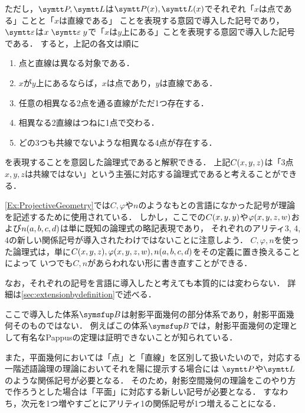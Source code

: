 \begin{Ex}
	ただし，\(\obj{P}, \obj{L}\)は\(\apply{\obj{P}}{x}, \apply{\obj{L}}{x}\)でそれぞれ「\(x\)は点である」ことと「\(x\)は直線である」
	ことを表現する意図で導入した記号であり，
	\(\LiesOn\)は\(x \LiesOn y\)で「\(x\)は\(y\)上にある」ことを表現する意図で導入した記号である．
	すると，上記の各文は順に
	\begin{enumerate}
		\item 点と直線は異なる対象である．
		\item \(x\)が\(y\)上にあるならば，\(x\)は点であり，\(y\)は直線である．
		\item 任意の相異なる2点を通る直線がただ1つ存在する．
		\item 相異なる2直線はつねに1点で交わる．
		\item どの3つも共線でないような相異なる4点が存在する．
	\end{enumerate}
	を表現することを意図した論理式であると解釈できる．
	上記\(\apply{C}{x, y, z}\)は「3点\(x, y, z\)は共線ではない」という主張に対応する論理式であると考えることができる．
\end{Ex}

\begin{Note}
	\cref{Ex:ProjectiveGeometry}では\(C, \varphi\)や\(n\)のようなもとの言語になかった記号が理論を記述するために使用されている．
	しかし，ここでの\(\apply{C}{x, y, y}\)や\(\apply{\varphi}{x, y, z, w}\)および\(\apply{n}{a, b, c, d}\)は単に既知の論理式の略記表現であり，
	それぞれのアリティ3, 4, 4の新しい関係記号が導入されたわけではないことに注意しよう．
	\(C, \varphi, n\)を使った論理式は，単に\(\apply{C}{x, y, z}, \apply{\varphi}{x, y, z, w}, \apply{n}{a, b, c, d}\)をその定義に置き換えることによって
	いつでも\(C, n\)があらわれない形に書き直すことができる．

	なお，それぞれの記号を言語に導入したと考えても本質的には変わらない．
	詳細は\cref{sec:extensionbydefinition}で述べる．
\end{Note}

\begin{Note}
	ここで導入した体系\(\ProjectiveGeometryPart\)は射影平面幾何の部分体系であり，射影平面幾何そのものではない．
	例えばこの体系\(\ProjectiveGeometryPart\)では，射影平面幾何の定理として有名なPappusの定理は証明できないことが知られている．

	また，平面幾何においては「点」と「直線」を区別して扱いたいので，対応する一階述語論理の理論においてそれを陽に提示する場合には
	\(\obj{P}\)や\(\obj{L}\)のような関係記号が必要となる．
	そのため，射影空間幾何の理論をこのやり方で作ろうとした場合は「平面」に対応する新しい記号が必要となる．
	すなわち，次元を1つ増やすごとにアリティ1の関係記号が1つ増えることになる．
\end{Note}



